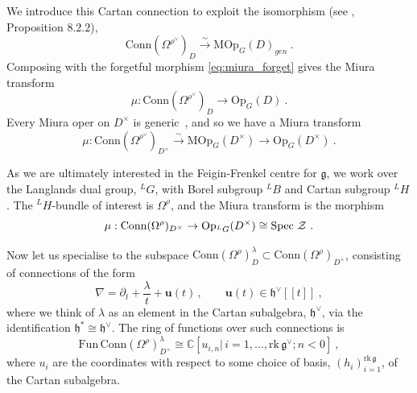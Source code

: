 \documentclass[a4paper]{article}
\def\IC{\mathbb{C}}
\def\ZZ{{\cal Z}}
\def\gf{\mathfrak{g}}
\def \Op{\mathrm{Op}}
\def \MOp{\mathrm{MOp}}
\begin{document}
We introduce this Cartan connection to exploit the isomorphism (see \cite{Frenkel:2007}, Proposition $8.2.2$),
\begin{equation}
	\mathrm{Conn}(\Omega^{\rho^\vee})_{D}\xrightarrow{\sim} \MOp_{G}(D)_{gen}~.
\end{equation}
Composing with the forgetful morphism \eqref{eq:miura_forget} gives the Miura transform
\begin{equation}
	\mu: \mathrm{Conn}(\Omega^{\rho^\vee})_D \rightarrow \Op_{G}(D)~.
\end{equation}
Every Miura oper on $D^\times$ is generic~\cite{Frenkel:2007}, and so we have a Miura transform
\begin{equation}
	\mu: \mathrm{Conn}(\Omega^{\rho^\vee})_{D^\times}\xrightarrow{\sim} \MOp_G(D^\times) \rightarrow \Op_{G}(D^\times)~.
\end{equation}

As we are ultimately interested in the Feigin-Frenkel centre for $\mathfrak{g}$, we work over the Langlands dual group, $^L G$, with Borel subgroup $^L B$ and Cartan subgroup $^L H$. The $^L H$-bundle of interest is $\Omega^\rho$, and the Miura transform is the morphism
\begin{equation}
	\mu : \mathrm{Conn}(\Omega^{\rho})_{D^\times}\rightarrow \Op_{^L G} (D^\times) \cong\mathrm{Spec}~ \ZZ~.
\end{equation}

Now let us specialise to the subspace $\mathrm{Conn}(\Omega^{\rho})^{\lambda}_{D}\subset\mathrm{Conn}(\Omega^{\rho})_{D^\times}$, consisting of connections of the form
\begin{equation}
	\nabla = \partial_t + \frac{\lambda}{t} + \mathbf{u}(t)\,, \qquad \mathbf{u}(t) \in \mathfrak{h}^\vee[[t]]~,
\end{equation}
where we think of $\lambda$ as an element in the Cartan subalgebra, $\mathfrak{h}^\vee$, via the identification $\mathfrak{h}^* \cong \mathfrak{h}^\vee$. The ring of functions over such connections is
\begin{equation}
	\mathrm{Fun\, Conn}(\Omega^\rho)_{D^\times}^\lambda \cong \IC[u_{i,n}|\,i = 1,\dots,\mathrm{rk}\, \gf^\vee; n<0]~,
\end{equation}
where $u_i$ are the coordinates with respect to some choice of basis, $(h_i)_{i=1}^{\mathrm{rk}\,\gf}$, of the Cartan subalgebra.
\end{document}
